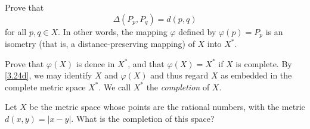 \begin{exercise}
\begin{exercise}[label = (\alph*), ref = \arabic{exercisei} (\alph*)]
    Prove that
    \[
    \Delta(P_p, P_q) = d(p, q)
    \]
    for all \(p,q\in X\).
    In other words, the mapping \(\varphi\) defined by \(\varphi(p) = P_p\) is
    an isometry (that is, a distance-preserving mapping) of \(X\) into \(X^*\).
  \item
    Prove that \(\varphi(X)\) is dence in \(X^*\), and that
    \(\varphi(X) = X^*\) if \(X\) is complete.
    By \cref{3.24d}, we may identify \(X\) and \(\varphi(X)\) and thus regard
    \(X\) as embedded in the complete metric space \(X^*\).
    We call \(X^*\) the \textit{completion} of \(X\).
  \end{exercise}
\item
  Let \(X\) be the metric space whose points are the rational numbers, with the
  metric \(d(x,y) = \lvert x - y\rvert\).
  What is the completion of this space?
\end{exercise}
